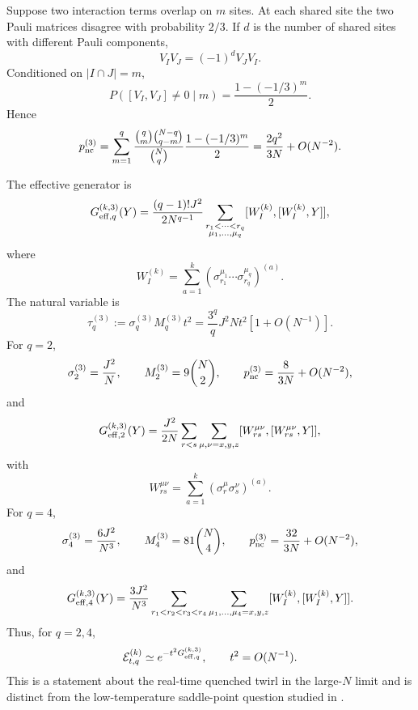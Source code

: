 \documentclass{article}
\theoremstyle{definition}
\begin{document}
Suppose two interaction terms overlap on $m$ sites.  At each shared site
the two Pauli matrices disagree with probability $2/3$.  If $d$ is the
number of shared sites with different Pauli components,
\begin{equation}
    V_IV_J=(-1)^dV_JV_I.
\end{equation}
Conditioned on $|I\cap J|=m$,
\begin{equation}
    P([V_I,V_J]\neq0\mid m)
    =\frac{1-(-1/3)^m}{2}.
\end{equation}
Hence
\begin{equation}
    p_{\rm nc}^{(3)}
    =\sum_{m=1}^q
    \frac{\binom qm\binom{N-q}{q-m}}{\binom Nq}
    \frac{1-(-1/3)^m}{2}
    =\frac{2q^2}{3N}+O(N^{-2}).
\end{equation}

The effective generator is
\begin{equation}
    G_{{\rm eff},q}^{(k,3)}(Y)
    =\frac{(q-1)!J^2}{2N^{q-1}}
    \sum_{\substack{r_1<\cdots<r_q\\
                    \mu_1,\ldots,\mu_q}}
    [W_I^{(k)},[W_I^{(k)},Y]],
\end{equation}
where
\begin{equation}
    W_I^{(k)}
    =\sum_{a=1}^k
    \left(
       \sigma_{r_1}^{\mu_1}\cdots\sigma_{r_q}^{\mu_q}
    \right)^{(a)}.
\end{equation}
The natural variable is
\begin{equation}
    \tau_q^{(3)}
    :=\sigma_q^{(3)}M_q^{(3)}t^2
    =\frac{3^q}{q}J^2Nt^2[1+O(N^{-1})].
\end{equation}
For $q=2$,
\begin{equation}
    \sigma_2^{(3)}=\frac{J^2}{N},
    \qquad
    M_2^{(3)}=9\binom N2,
    \qquad
    p_{\rm nc}^{(3)}=\frac{8}{3N}+O(N^{-2}),
\end{equation}
and
\begin{equation}
    G_{{\rm eff},2}^{(k,3)}(Y)
    =\frac{J^2}{2N}
    \sum_{r<s}\sum_{\mu,\nu=x,y,z}
    [W_{rs}^{\mu\nu},[W_{rs}^{\mu\nu},Y]],
\end{equation}
with
\begin{equation}
    W_{rs}^{\mu\nu}
    =\sum_{a=1}^k(\sigma_r^\mu\sigma_s^\nu)^{(a)}.
\end{equation}
For $q=4$,
\begin{equation}
    \sigma_4^{(3)}=\frac{6J^2}{N^3},
    \qquad
    M_4^{(3)}=81\binom N4,
    \qquad
    p_{\rm nc}^{(3)}=\frac{32}{3N}+O(N^{-2}),
\end{equation}
and
\begin{equation}
    G_{{\rm eff},4}^{(k,3)}(Y)
    =\frac{3J^2}{N^3}
    \sum_{r_1<r_2<r_3<r_4}
    \sum_{\mu_1,\ldots,\mu_4=x,y,z}
    [W_I^{(k)},[W_I^{(k)},Y]].
\end{equation}
Thus, for $q=2,4$,
\begin{equation}
    {\cal E}_{t,q}^{(k)}
    \simeq e^{-t^2G_{{\rm eff},q}^{(k,3)}},
    \qquad t^2=O(N^{-1}).
\end{equation}
This is a statement about the real-time quenched twirl in the 
large-$N$ limit and is distinct from the low-temperature saddle-point
question studied in \cite{swingle2024bosonic}.
\end{document}
